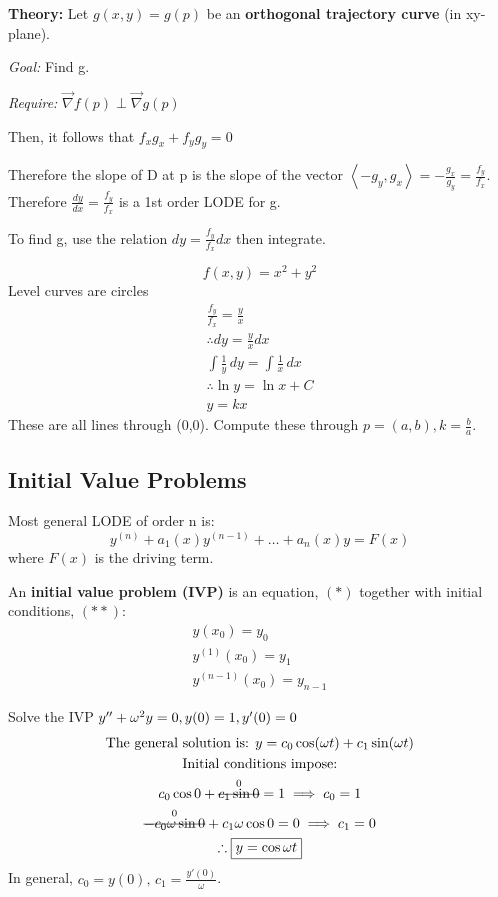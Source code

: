 \documentclass[../main.tex]{subfiles}
\begin{document}
\textbf{Theory:}
Let \( g(x,y)=g(p) \) be an \textbf{orthogonal trajectory curve} (in xy-plane).

\textit{Goal:} Find g.

\textit{Require:} \( \vec{\nabla}f(p)\perp\vec{\nabla}g(p) \)

Then, it follows that \( f_{x}g_{x}+f_{y}g_{y}=0 \)

Therefore the slope of D at p is the slope of the vector \( \displaystyle \left< -g_{y},g_{x} \right> =-\frac{g_{x}}{g_{y}}=\frac{f_{y}}{f_{x}} \). \\
Therefore \( \displaystyle \frac{dy}{dx}=\frac{f_{y}}{f_{x}} \) is a 1st order LODE for g.

To find g, use the relation \( \displaystyle dy=\frac{f_{y}}{f_{x}}dx \) then integrate.

\begin{example}[]
    \[ f(x,y)=x^2+y^2 \]
    Level curves are circles
    \begin{gather*}
        \frac{f_{y}}{f_{x}}=\frac{y}{x} \\
        \therefore dy=\frac{y}{x}dx \\
        \int \frac{1}{y} \, dy = \int \frac{1}{x} \, dx \\
        \therefore \ln y=\ln x + C \\
        y=kx
    \end{gather*}
    These are all lines through (0,0).
    Compute these through \( \displaystyle p=(a,b),k=\frac{b}{a} \).
\end{example}

\subsection{Initial Value Problems}

Most general LODE of order n is:
\[ y^{(n)}+a_{1}(x)y^{(n-1)}+\dots+a_{n}(x)y=F(x) \]
where \( F(x) \) is the driving term.

\vbox{
    An \textbf{initial value problem (IVP)} is an equation, \( (*) \) together with initial conditions, \( (* *) \):
    \begin{gather*}
        y(x_{0})=y_{0} \\
        y^{(1)}(x_{0})=y_{1} \\
        y^{(n-1)}(x_{0})=y_{n-1}
    \end{gather*}
}


\begin{example}[]
    Solve the IVP \( y''+\omega^2y=0, \space y(0)=1,\space y'(0)=0 \)
    \begin{gather*}
        \text{The general solution is: } y=c_{0}\cos(\omega t)+c_{1}\sin(\omega t) \\
        \text{Initial conditions impose:} \\
        c_{0}\cos0+\overset{0}{\msout{c_{1}\sin0}}=1 \implies c_0 = 1 \\
        \overset{0}{\msout{-c_0\omega\sin0}}+c_1\omega\cos0=0 \implies c_1 = 0 \\
        \therefore \boxed{y=\cos \omega t}
    \end{gather*}
    In general, \( c_0 = y(0),\,c_1 = \frac{y'(0)}{\omega} \).
\end{example}
\end{document}
